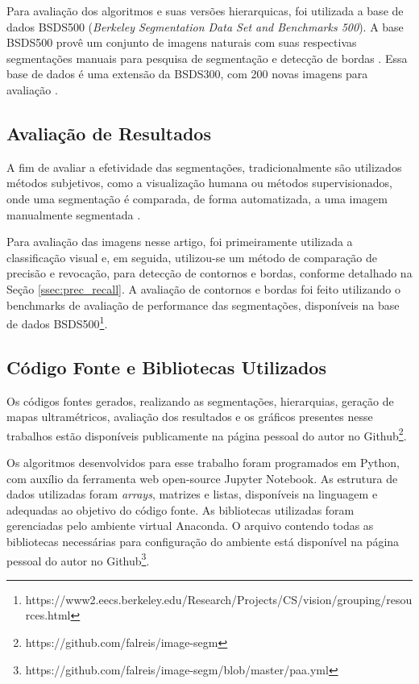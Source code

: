 \begin{document}
Para avaliação dos algoritmos e suas versões hierarquicas, foi utilizada a base de dados BSDS500 (\textit{Berkeley Segmentation Data Set and Benchmarks 500}). A base BSDS500 provê um conjunto de imagens naturais com suas respectivas segmentações manuais para pesquisa de segmentação e detecção de bordas \cite{BSDS500}. Essa base de dados é uma extensão da BSDS300, com 200 novas imagens para avaliação \cite{BSDS500}.


\subsection{Avaliação de Resultados} \label{ssec:aval_resultados}

A fim de avaliar a efetividade das segmentações, tradicionalmente são utilizados métodos subjetivos, como a visualização humana ou métodos supervisionados, onde uma segmentação é comparada, de forma automatizada, a uma imagem manualmente segmentada \cite{ZHANG2008}. 

Para avaliação das imagens nesse artigo, foi primeiramente utilizada a classificação visual e, em seguida, utilizou-se um método de comparação de precisão e revocação, para detecção de contornos e bordas, conforme detalhado na Seção \ref{ssec:prec_recall}. A avaliação de contornos e bordas foi feito utilizando o benchmarks de avaliação de performance das segmentações, disponíveis na base de dados BSDS500\footnote{https://www2.eecs.berkeley.edu/Research/Projects/CS/vision/grouping/resources.html}.



\subsection{Código Fonte e Bibliotecas Utilizados} \label{ssec:cod_fonte}

Os códigos fontes gerados, realizando as segmentações, hierarquias, geração de mapas ultramétricos, avaliação dos resultados e os gráficos presentes nesse trabalhos estão disponíveis publicamente na página pessoal do autor no Github\footnote{https://github.com/falreis/image-segm}.

Os algoritmos desenvolvidos para esse trabalho foram programados em Python, com auxílio da ferramenta web open-source Jupyter Notebook. As estrutura de dados utilizadas foram \textit{arrays}, matrizes e listas, disponíveis na linguagem e adequadas ao objetivo do código fonte. As bibliotecas utilizadas foram gerenciadas pelo ambiente virtual Anaconda. O arquivo contendo todas as bibliotecas necessárias para configuração do ambiente está disponível na página pessoal do autor no Github\footnote{https://github.com/falreis/image-segm/blob/master/paa.yml}.
\end{document}
